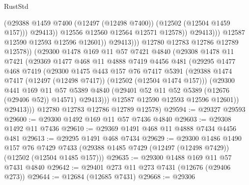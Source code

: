 \begin{lexlean}{RustStd}
\begin{coremodule}
                                      (@29388
                                        @1459
                                        @7400
                                        (@12497 (@12498 @7400))
                                        (@12502 (@12504 @1459 @157)))
                                      @29413))
                                  @12556
                                  @12560
                                  @12564
                                  @12571
                                  @12578))
                              @29413)))
                        @12587
                        @12590
                        @12593
                        @12596
                        @12601))
                    @29413)))
              @12780
              @12783
              @12786
              @12789
              @12578))
          (@29300
            @1478
            @169
            @11
            @57
            @7421
            @4840
            (@29308
              @1478
              @11
              @7421
              (@29369
                @1477
                @468
                @11
                @4888
                @7419
                @4456
                @481
                (@29295
                  @1477
                  @468
                  @7419
                  (@29300
                    @1475
                    @443
                    @157
                    @76
                    @7417
                    @5391
                    (@29388 @1474 @7417 (@12497 (@12498 @7417)) (@12502 (@12504 @1474 @157)))
                    (@29300
                      @441
                      @169
                      @11
                      @57
                      @5389
                      @4840
                      (@29401 @52 @11 @52 @5389 (@12676 (@29406 @52)) @14571)
                      @29413)))
                @12587
                @12590
                @12593
                @12596
                @12601))
            @29413)))
      @12780
      @12783
      @12786
      @12789
      @12578)
@29594 := @29327 @29593
@29600 := @29300 @1492 @169 @11 @57 @7436 @4840
@29603 := @29308 @1492 @11 @7436
@29610 := @29369 @1491 @468 @11 @4888 @7434 @4456 @481
@29613 := @29295 @1491 @468 @7434
@29629 := @29300
    @1486
    @1490
    @157
    @76
    @7429
    @7433
    (@29388 @1485 @7429 (@12497 (@12498 @7429)) (@12502 (@12504 @1485 @157)))
@29635 := @29300 @1488 @169 @11 @57 @7431 @4840
@29642 := @29401 @273 @11 @273 @7431 (@12676 (@29406 @273))
@29644 := @12684 (@12685 @7431)
@29668 := @29306

\end{coremodule}
\end{lexlean}
